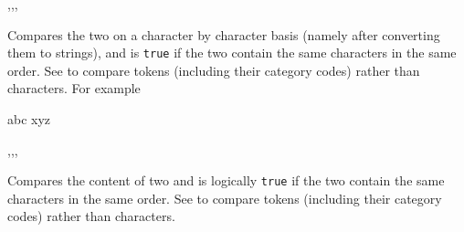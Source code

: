 \documentclass[oneside]{book}
\begin{document}
\begin{function}{\strIfEq,\strIfEqT,\strIfEqF,\strIfEqTF}
\begin{syntax}
  
   
   
    
\end{syntax}
Compares the two  on a character by character
basis (namely after converting them to strings),
and is \texttt{true} if the two  contain the same
characters in the same order.
See  to compare
tokens (including their category codes) rather than characters.
For example
\begin{demohigh}
 {abc} {} {}
 {xyz} {} {}
\end{demohigh}
\end{function}

\begin{function}{\strVarIfEq,\strVarIfEqT,\strVarIfEqF,\strVarIfEqTF}
\begin{syntax}
  
   
   
    
\end{syntax}
Compares the content of two  and
is logically \texttt{true} if the two contain the same characters
in the same order.  See  to compare tokens
(including their category codes) rather than characters.
\begin{demohigh}
\strSet {}
\strSet {}
\strSet {}
\strVarIfEqTF \lTmpaStr {} {}
\strVarIfEqTF \lTmpaStr {} {}
\end{demohigh}
\end{function}
\end{document}
